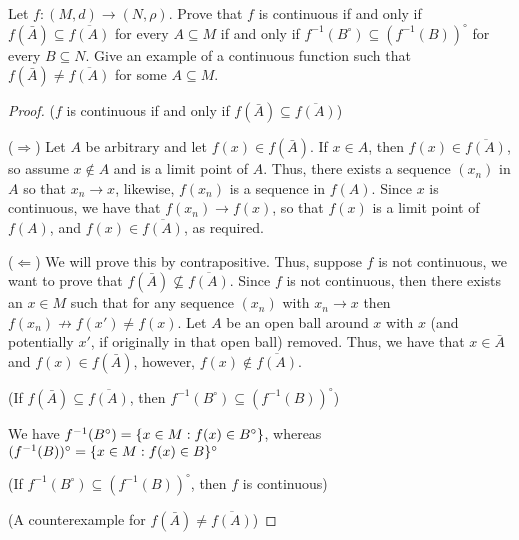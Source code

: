 \begin{exercise}{30}
Let $f: (M,d) \to (N,\rho)$.
Prove that $f$ is continuous if and only if $f(\bar{A})\subseteq \overline{f(A)}$ for every $A \subseteq M$ if and only if $f^{-1}(B^\circ) \subseteq (f^{-1}(B))^\circ$ for every $B \subseteq N$.
Give an example of a continuous function such that $f(\bar{A}) \neq \overline{f(A)}$ for some $A \subseteq M$.
\end{exercise}
\begin{proof}
($f$ is continuous if and only if $f(\bar{A})\subseteq \overline{f(A)}$)

($\Rightarrow$)
Let $A$ be arbitrary and let $f(x)\in f(\bar{A})$.
If $x\in A$, then $f(x)\in\overline{f(A)}$, so assume $x\notin A$ and is a limit point of $A$.
Thus, there exists a sequence $(x_n)$ in $A$ so that $x_n\to x$, likewise, $f(x_n)$ is a sequence in $f(A)$.
Since $x$ is continuous, we have that $f(x_n)\to f(x)$, so that $f(x)$ is a limit point of $f(A)$, and $f(x)\in\overline{f(A)}$, as required.

($\Leftarrow$)
We will prove this by contrapositive.
Thus, suppose $f$ is not continuous, we want to prove that $f(\bar{A}) \not\subseteq \overline{f(A)}$.
Since $f$ is not continuous, then there exists an $x\in M$ such that for any sequence $(x_n)$ with $x_n\to x$ then $f(x_n)\not\to f(x') \neq f(x)$.
Let $A$ be an open ball around $x$ with $x$ (and potentially $x'$, if originally in that open ball) removed.
Thus, we have that $x\in\bar{A}$ and $f(x) \in f(\bar{A})$, however, $f(x)\notin \overline{f(A)}$.

(If $f(\bar{A})\subseteq \overline{f(A)}$, then $f^{-1}(B^\circ) \subseteq (f^{-1}(B))^\circ$)

We have $f^{-1}(B^\circ) =\{x \in M: f(x) \in B^\circ\}$, whereas $(f^{-1}(B))^\circ = \{x \in M: f(x) \in B\}^\circ$

(If $f^{-1}(B^\circ) \subseteq (f^{-1}(B))^\circ$, then $f$ is continuous)

(A counterexample for $f(\bar{A}) \neq \overline{f(A)}$)
\end{proof} 

